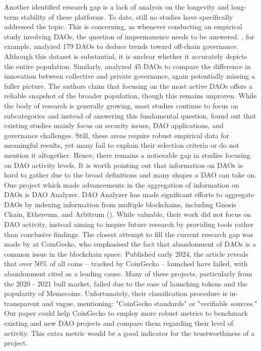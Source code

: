 Another identified research gap is a lack of analysis on the longevity and long-term stability of these platforms.
To date, still no studies have specifically addressed the topic.
This is concerning, as whenever conducting an empirical study involving DAOs, the question of impermanence needs to be answered. 
\textcite{monteiro2024exploring}, for example, analyzed 179 DAOs to deduce trends toward off-chain governance.
Although this dataset is substantial, it is unclear whether it accurately depicts the entire population.
Similarly, \textcite{hsieh2024decentralized} analyzed 45 DAOs to compare the difference in innovation between collective and private governance, again potentially missing a fuller picture.
The authors claim that focusing on the most active DAOs offers a reliable snapshot of the broader population, though this remains unproven. 
While the body of research is generally growing, most studies continue to focus on subcategories and instead of answering this fundamental question,
\textcite{liu2021technology} found out that existing studies mainly focus on security issues, DAO applications, and governance challenges.
Still, these areas require robust empirical data for meaningful results, yet many fail to explain their selection criteria or do not mention it altogether.
Hence, there remains a noticeable gap in studies focusing on DAO activity levels.
It is worth pointing out that information on DAOs is hard to gather due to the broad definitions and many shapes a DAO can take on. One project which made advancements in the aggregation of information on DAOs is DAO Analyzer.
DAO Analyzer has made significant efforts to aggregate DAOs by indexing information from multiple blockchains, including Gnosis Chain, Ethereum, and Arbitrum (\cite{arroyo2022dao}).
While valuable, their work did not focus on DAO activity, instead aiming to inspire future research by providing tools rather than conclusive findings.
The closest attempt to fill the current research gap was made 
by \textcite{Lee_2024} at CoinGecko, who emphasised the fact that abandonment of DAOs is a common issue in the blockchain space.
Published early 2024, the article reveals that over 50\% of all coins -- tracked by CoinGecko -- launched 
have failed, with abandonment cited as a leading cause.
Many of these projects, particularly from the 2020 - 2021 bull market, failed due to the ease of launching tokens and the popularity of Memecoins. 
Unfortunately, their classification procedure is in-transparent and vague, mentioning: "CoinGecko standards" or "verifiable sources."
Our paper could help CoinGecko to employ more robust metrics to benchmark existing and new DAO projects and compare them regarding their level of activity. This extra metric would be a good indicator for the trustworthiness of a project.

